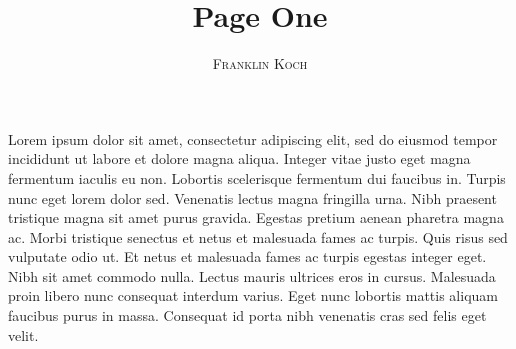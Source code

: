 \documentclass[a4paper,11pt,oneside]{book}
\title{\Huge \textbf{Page One}}
\author{\textsc{Franklin Koch}}
\begin{document}
\sloppy

\frontmatter
\maketitle

\tableofcontents

\mainmatter

% 
% 

Lorem ipsum dolor sit amet, consectetur adipiscing elit, sed do eiusmod tempor incididunt ut labore et dolore magna aliqua. Integer vitae justo eget magna fermentum iaculis eu non. Lobortis scelerisque fermentum dui faucibus in. Turpis nunc eget lorem dolor sed. Venenatis lectus magna fringilla urna. Nibh praesent tristique magna sit amet purus gravida. Egestas pretium aenean pharetra magna ac. Morbi tristique senectus et netus et malesuada fames ac turpis. Quis risus sed vulputate odio ut. Et netus et malesuada fames ac turpis egestas integer eget. Nibh sit amet commodo nulla. Lectus mauris ultrices eros in cursus. Malesuada proin libero nunc consequat interdum varius. Eget nunc lobortis mattis aliquam faucibus purus in massa. Consequat id porta nibh venenatis cras sed felis eget velit.
\end{document}
